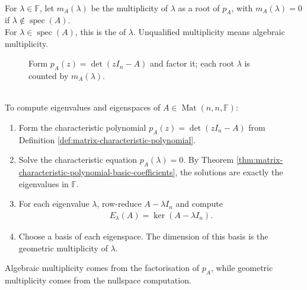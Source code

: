\begin{definition} \label{def:matrix-algebraic-multiplicity} \\
For $\lambda\in\mathbb{F}$, let $m_A(\lambda)$ be the multiplicity of $\lambda$ as a root of $p_A$, with $m_A(\lambda)=0$ if $\lambda\notin\operatorname{spec}(A)$.\\
For $\lambda\in\operatorname{spec}(A)$, this is the  of $\lambda$. Unqualified multiplicity means algebraic multiplicity.
\end{definition}

\begin{figure}[H]
  \centering
  
  \caption{Form $p_A(z)=\det(zI_n-A)$ and factor it; each root $\lambda$ is counted by $m_A(\lambda)$.}
  \label{fig:characteristic-polynomial-roots}
\end{figure}

\begin{method} \label{meth:characteristic-equation-eigenspace-computation} \\
To compute eigenvalues and eigenspaces of $A\in\operatorname{Mat}(n,n,\mathbb{F})$:
\begin{enumerate}[label=(\roman*)]
\setlength{\itemsep}{0pt}
\item Form the characteristic polynomial $p_A(z)=\det(zI_n-A)$ from Definition \ref{def:matrix-characteristic-polynomial}.
\item Solve the characteristic equation $p_A(\lambda)=0$. By Theorem \ref{thm:matrix-characteristic-polynomial-basic-coefficients}, the solutions are exactly the eigenvalues in $\mathbb{F}$.
\item For each eigenvalue $\lambda$, row-reduce $A-\lambda I_n$ and compute
\begin{align}
E_{\lambda}(A)=\ker(A-\lambda I_n). \nonumber
\end{align}
\item Choose a basis of each eigenspace. The dimension of this basis is the geometric multiplicity of $\lambda$.
\end{enumerate}
Algebraic multiplicity comes from the factorisation of $p_A$, while geometric multiplicity comes from the nullspace computation.
\end{method}

